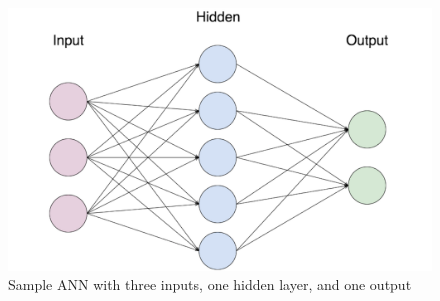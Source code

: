 \begin{figure}
    \centerline{\includegraphics[width=1\columnwidth]{03-neural-networks-in-tumor-detection/figures/sample-ann.png}}
    \caption{Sample ANN with three inputs, one hidden layer, and one output }
    \label{fig:sample-ann}
\end{figure}